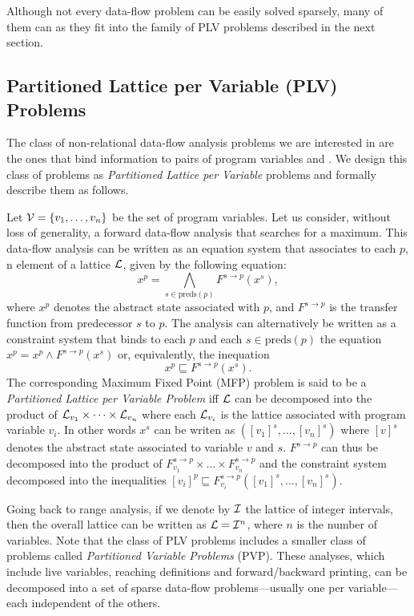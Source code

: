 {Although not every data-flow problem can be easily solved sparsely, many of 
them can as they fit into the family of PLV problems described in the next 
section.

\subsection{Partitioned Lattice per Variable (PLV) Problems}
\label{sec:ssi:pereira:pvpPvl}

The class of non-relational data-flow analysis problems we are interested in are the ones that bind information to pairs of program variables and \progpoints.
We design this class of problems as \emph{Partitioned Lattice per 
Variable} problems 
and formally describe them as follows.

\begin{definition}[PLV]
Let ${\cal V}=\{v_1,\dots,v_n\}$ be the set of program variables.
Let us consider, without loss of generality, a forward data-flow analysis that 
searches for a maximum.
This data-flow analysis can be written as an equation system that associates to 
each \progpoint $p$, n element of a lattice ${\cal L}$, given by the following 
equation:
$$x^p = \bigwedge_{s \in \textrm{preds}(p)} F^{s\to p}(x^s),$$
where $x^p$ denotes the abstract state associated  with \progpoint $p$, and
$F^{s\to p}$ is the transfer function from predecessor $s$ to $p$.
The analysis can alternatively be written as a constraint system that binds to 
each \progpoint $p$ and each $s\in \textrm{preds}(p)$ the equation $x^p = x^p 
\wedge  F^{s\to p}(x^s)$ or, equivalently, the inequation $$x^p \sqsubseteq  
F^{s\to p}(x^s).$$
The corresponding Maximum Fixed Point (MFP) problem is said to be 
a \emph{Partitioned Lattice per Variable Problem} iff $\cal L$ can be 
decomposed into the product of ${\cal L}_{v_1}\times \dots \times {\cal 
L}_{v_n}$ where each ${\cal L}_{v_i}$ is the lattice associated with program 
variable $v_i$. In other words $x^s$ can be writen as $([v_1]^s,\dots,[v_n]^s)$ 
where $[v]^s$ denotes the abstract state associated to variable $v$ and 
\progpoint $s$. $F^{s\to p}$ can thus be decomposed into the product of 
$F^{s\to p}_{v_1}\times \dots\times F^{s\to p}_{v_n}$ and the constraint system 
decomposed into the inequalities $[v_i]^p\sqsubseteq  F^{s\to 
p}_{v_i}([v_1]^s,\dots,[v_n]^s)$.
\end{definition}

Going back to range analysis, if we denote by $\cal I$ the lattice of integer intervals, then the overall lattice can be written as ${\cal L}={\cal I}^n$, where $n$ is the number of variables.
%
Note that the class of PLV problems includes a smaller class of problems called 
{\em Partitioned Variable Problems} (PVP).
These analyses, which include live variables, reaching definitions and 
forward/backward printing, can be decomposed into a set of sparse data-flow 
problems---usually one per variable---each independent of the others.

}
